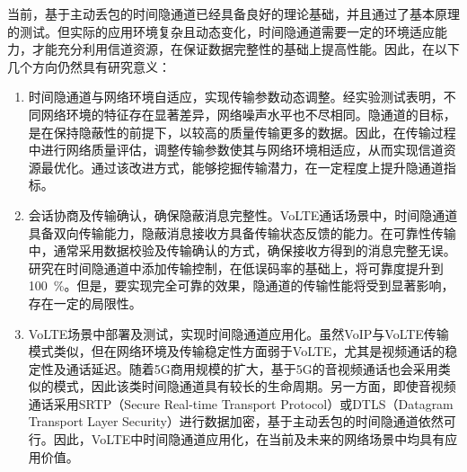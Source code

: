 \begin{conclusion}
当前，基于主动丢包的时间隐通道已经具备良好的理论基础，并且通过了基本原理的测试。但实际的应用环境复杂且动态变化，时间隐通道需要一定的环境适应能力，才能充分利用信道资源，在保证数据完整性的基础上提高性能。因此，在以下几个方向仍然具有研究意义：
\begin{enumerate}
    \item
    时间隐通道与网络环境自适应，实现传输参数动态调整。经实验测试表明，不同网络环境的特征存在显著差异，网络噪声水平也不尽相同。隐通道的目标，是在保持隐蔽性的前提下，以较高的质量传输更多的数据。因此，在传输过程中进行网络质量评估，调整传输参数使其与网络环境相适应，从而实现信道资源最优化。通过该改进方式，能够挖掘传输潜力，在一定程度上提升隐通道指标。
    
    \item
    会话协商及传输确认，确保隐蔽消息完整性。VoLTE通话场景中，时间隐通道具备双向传输能力，隐蔽消息接收方具备传输状态反馈的能力。在可靠性传输中，通常采用数据校验及传输确认的方式，确保接收方得到的消息完整无误。研究在时间隐通道中添加传输控制，在低误码率的基础上，将可靠度提升到{100\ \%}。但是，要实现完全可靠的效果，隐通道的传输性能将受到显著影响，存在一定的局限性。
    
    \item
    VoLTE场景中部署及测试，实现时间隐通道应用化。虽然VoIP与VoLTE传输模式类似，但在网络环境及传输稳定性方面弱于VoLTE，尤其是视频通话的稳定性及通话延迟。随着5G商用规模的扩大，基于5G的音视频通话也会采用类似的模式，因此该类时间隐通道具有较长的生命周期。另一方面，即使音视频通话采用SRTP（Secure Real-time Transport Protocol）或DTLS（Datagram Transport Layer Security）进行数据加密，基于主动丢包的时间隐通道依然可行。因此，VoLTE中时间隐通道应用化，在当前及未来的网络场景中均具有应用价值。

\end{enumerate}

\end{conclusion}